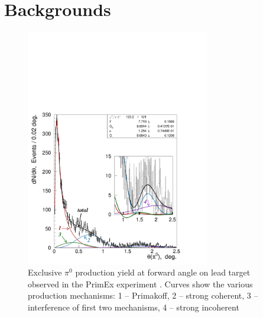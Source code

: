 
\section{Backgrounds}

\begin{figure}[tbp]
\begin{center}
\includegraphics[width=8cm,angle=0,trim={1.5cm 0.5cm 3.5cm 9.5cm},clip]{figures/dndt_pb_partial.pdf}
\end{center}
\caption{Exclusive $\pi^0$ production yield at forward angle on lead target
  observed in the PrimEx experiment \cite{Larin:2010kq}. Curves show the various
  production mechanisms:
1 -- Primakoff, 2 -- strong coherent, 3 -- interference of first two mechanisms, 4 -- strong incoherent}
\label{fig:leaddndt}
\end{figure}




